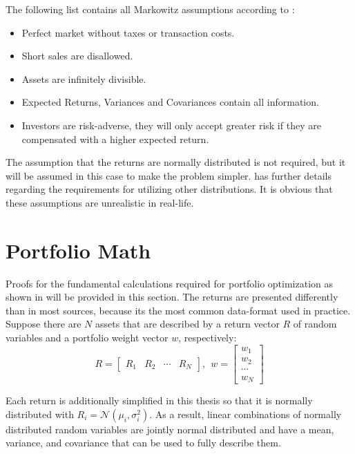 \documentclass[
  oneside]{book}
\providecommand{\tightlist}{%
  \setlength{\itemsep}{0pt}\setlength{\parskip}{0pt}}
\begin{document}
The following list contains all Markowitz assumptions according to \citep{Mari2005}:

\begin{itemize}
\tightlist
\item
  Perfect market without taxes or transaction costs.
\item
  Short sales are disallowed.
\item
  Assets are infinitely divisible.
\item
  Expected Returns, Variances and Covariances contain all information.
\item
  Investors are risk-adverse, they will only accept greater risk if they
  are compensated with a higher expected return.
\end{itemize}

The assumption that the returns are normally distributed is not required, but it will be assumed in this case to make the problem simpler. \citep{Mari2005} has further details regarding the requirements for utilizing other distributions. It is obvious that these assumptions are unrealistic in real-life.

\hypertarget{portfolio-math}{%
\section{Portfolio Math}\label{portfolio-math}}

Proofs for the fundamental calculations required for portfolio optimization as shown in \citep{Eric2021} will be provided in this section. The returns are presented differently than in most sources, because its the most common data-format used in practice. Suppose there are \(N\) assets that are described by a return vector \(R\) of random variables and a portfolio weight vector \(w\), respectively:
\[
  R = 
  \begin{bmatrix}
    R_{1} & R_{2} & \cdots & R_{N}  
 \end{bmatrix}
 , \ \ 
 w = 
  \begin{bmatrix}
    w_{1} \\ 
    w_{2} \\
    \cdots \\
    w_{N}  
 \end{bmatrix}
\]

Each return is additionally simplified in this thesis so that it is normally distributed with \(R_i = \mathcal{N}(\mu_i, \sigma_i^2)\). As a result, linear combinations of normally distributed random variables are jointly normal distributed and have a mean, variance, and covariance that can be used to fully describe them.
\end{document}
